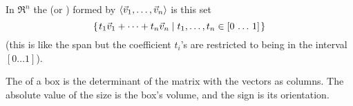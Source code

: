 \documentclass[noanswers, nolegalese, 11pt]{examjh}
\begin{document}
\thispagestyle{empty}
\vspace{-1ex}
\makebox[\textwidth]{\hbox{}\hrulefill\hbox{}}

In $\Re^n$
the 
(or )
formed by 
\( \langle\vec{v}_1,\dots,\vec{v}_n\rangle \) 
is this set
\begin{equation*}
  \mbox{$\{\hspace{0.1em}t_1\vec{v}_1+\dots+t_n\vec{v}_n
      \mid t_1,\ldots,t_n\in [0\,\ldots\, 1]\hspace{0.1em}\}$} 
\end{equation*}
(this is like the span but the coefficient $t_i$'s are restricted
to being in the interval $[0\ldots 1]$).

The  of a box is the determinant of the matrix
with the vectors as columns.
The absolute value of the size is the box's volume, and the sign
is its orientation.
\end{document}
